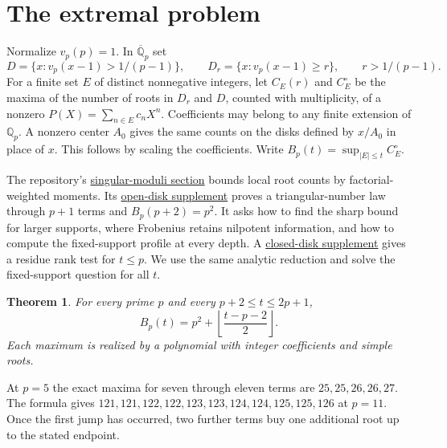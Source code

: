 \documentclass[11pt,letterpaper]{article}
\author{A research supplement to the ProveIt project}
\date{27 November 2026}
\newtheorem{theorem}{Theorem}
\newcommand{\Q}{\mathbb Q}\newcommand{\Z}{\mathbb Z}\newcommand{\F}{\mathbb F}
\newcommand{\ord}{v_p}\newcommand{\ds}{s_p}
\newcommand{\src}[2]{\href{https://github.com/VladimirReshetnikov/ProveIt/blob/cc919c585f90be8e0fba7a1b90c70afdea39998e/Analysis/GeneralizedRiemannHypothesis/#1}{#2}}
\begin{document}
\maketitle
\begin{abstract}
How many roots of a polynomial with at most $t$ monomials can lie strictly inside the $p$-adic exponential disk? A first jump to $p^2$ occurs at $t=p+2$. We prove that the exact maximum through $2p+1$ terms is $p^2+\lfloor(t-p-2)/2\rfloor$. For arbitrary $t$ we give a finite determinant formula for the entire depth profile on each fixed support. Its input requires only the exponent polynomial modulo an explicit power of $p$. We prove that the necessary number of residue digits attains our upper bound for infinitely many term budgets at each prime. The proofs use integral moment recurrences and the stabilization of Frobenius on a finite exponent algebra. All root counts are geometric and the results are unconditional.
\end{abstract}

\section{The extremal problem}
Normalize $\ord(p)=1$. In $\overline{\Q}_p$ set
\[
 D=\{x:\ord(x-1)>1/(p-1)\},\qquad
 D_r=\{x:\ord(x-1)\ge r\},\qquad r>1/(p-1).
\]
For a finite set $E$ of distinct nonnegative integers, let $C_E(r)$ and $C_E^\circ$ be the maxima of the number of roots in $D_r$ and $D$, counted with multiplicity, of a nonzero $P(X)=\sum_{n\in E}c_nX^n$. Coefficients may belong to any finite extension of $\Q_p$. A nonzero center $A_0$ gives the same counts on the disks defined by $x/A_0$ in place of $x$. This follows by scaling the coefficients. Write $B_p(t)=\sup_{|E|\le t} C_E^\circ$.

The repository's \src{Article/sections/smd.tex}{singular-moduli section} bounds local root counts by factorial-weighted moments. Its \src{Research/sparse-padic-roots-and-graph-towers/fewnomial/paper.tex}{open-disk supplement} proves a triangular-number law through $p+1$ terms and $B_p(p+2)=p^2$. It asks how to find the sharp bound for larger supports, where Frobenius retains nilpotent information, and how to compute the fixed-support profile at every depth. A \src{Research/padic-support-rank/report.tex}{closed-disk supplement} gives a residue rank test for $t\le p$. We use the same analytic reduction and solve the fixed-support question for all $t$.

\begin{theorem}\label{thm:stairs}
For every prime $p$ and every $p+2\le t\le 2p+1$,
\[
 \boxed{\displaystyle B_p(t)=p^2+\left\lfloor\frac{t-p-2}{2}\right\rfloor.}
\]
Each maximum is realized by a polynomial with integer coefficients and simple roots.
\end{theorem}
At $p=5$ the exact maxima for seven through eleven terms are $25,25,26,26,27$. The formula gives $121,121,122,122,123,123,124,124,125,125,126$ at $p=11$. Once the first jump has occurred, two further terms buy one additional root up to the stated endpoint.
\end{document}
